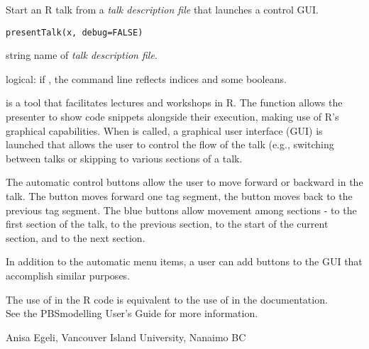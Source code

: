 \documentclass[letterpaper]{book}
\begin{document}
\begin{Description}\relax
Start an R talk from a \emph{talk description file} that launches a control GUI.
\end{Description}
\begin{Usage}
\begin{verbatim}
presentTalk(x, debug=FALSE)
\end{verbatim}
\end{Usage}
\begin{Arguments}
\begin{ldescription}
\item[\code{x}] string name of \emph{talk description file}.
\item[\code{debug}] logical: if , the command line reflects indices and some booleans.
\end{ldescription}
\end{Arguments}
\begin{Details}\relax
{} is a tool that facilitates lectures and workshops in R.
The function allows the presenter to show code snippets alongside their 
execution, making use of R's graphical capabilities. 
When  is called, a graphical user interface (GUI) is 
launched that allows the user to control the flow of the talk (e.g., 
switching between talks or skipping to various sections of a talk.

The automatic control buttons allow the user
to move forward or backward in the talk. The  button moves forward 
one tag segment, the  button moves back to the previous tag segment.
The blue buttons allow movement among sections -  to the first 
section of the talk,  to the previous section,  to the 
start of the current section, and  to the next section.

In addition to the automatic menu items, a user can add buttons to the GUI 
that accomplish similar purposes.
\end{Details}
\begin{Note}\relax
The use of  in the R code is equivalent to the use of 
 in the documentation.\\
See the PBSmodelling User's Guide for more information.
\end{Note}
\begin{Author}\relax
Anisa Egeli, Vancouver Island University, Nanaimo BC
\end{Author}
\end{document}
